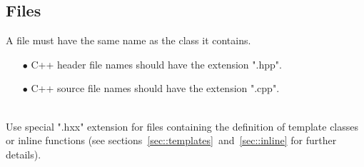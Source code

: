 \subsection{Files}
\label{file_extension}
A file must have the same name as the class it contains.
\begin{itemize}
\item[$\bullet$] C++ header file names should have the extension ".hpp".
\item[$\bullet$] C++ source file names should have the extension ".cpp".
\end{itemize}
\ \\ Use special ".hxx" extension for files containing the definition
of template classes or inline functions (see
sections~\ref{sec::templates}~and~\ref{sec::inline} for further
details).
